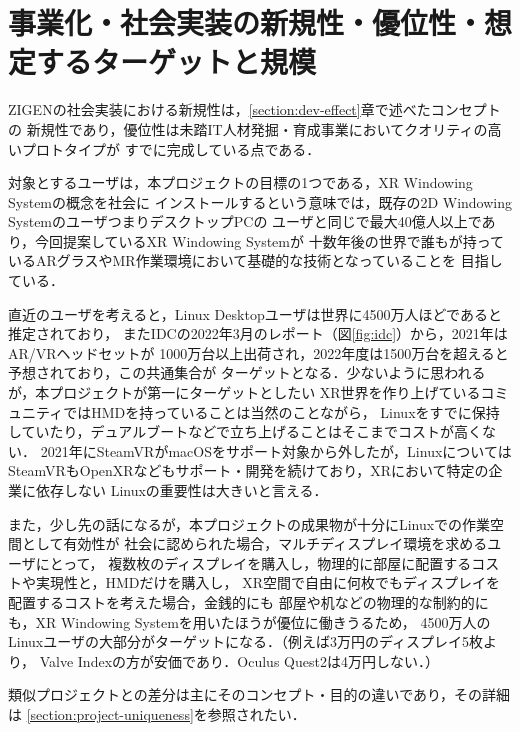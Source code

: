 \section{事業化・社会実装の新規性・優位性・想定するターゲットと規模}


ZIGENの社会実装における新規性は，\ref{section:dev-effect}章で述べたコンセプトの
新規性であり，優位性は未踏IT人材発掘・育成事業においてクオリティの高いプロトタイプが
すでに完成している点である．

対象とするユーザは，本プロジェクトの目標の1つである，XR Windowing Systemの概念を社会に
インストールするという意味では，既存の2D Windowing SystemのユーザつまりデスクトップPCの
ユーザと同じで最大40億人以上であり，今回提案しているXR Windowing Systemが
十数年後の世界で誰もが持っているARグラスやMR作業環境において基礎的な技術となっていることを
目指している．

直近のユーザを考えると，Linux Desktopユーザは世界に4500万人ほどであると推定されており，
またIDCの2022年3月のレポート（図\ref{fig:idc}）から，2021年はAR/VRヘッドセットが
1000万台以上出荷され，2022年度は1500万台を超えると予想されており，この共通集合が
ターゲットとなる．少ないように思われるが，本プロジェクトが第一にターゲットとしたい
XR世界を作り上げているコミュニティではHMDを持っていることは当然のことながら，
Linuxをすでに保持していたり，デュアルブートなどで立ち上げることはそこまでコストが高くない．
2021年にSteamVRがmacOSをサポート対象から外したが，Linuxについては
SteamVRもOpenXRなどもサポート・開発を続けており，XRにおいて特定の企業に依存しない
Linuxの重要性は大きいと言える．

また，少し先の話になるが，本プロジェクトの成果物が十分にLinuxでの作業空間として有効性が
社会に認められた場合，マルチディスプレイ環境を求めるユーザにとって，
複数枚のディスプレイを購入し，物理的に部屋に配置するコストや実現性と，HMDだけを購入し，
XR空間で自由に何枚でもディスプレイを配置するコストを考えた場合，金銭的にも
部屋や机などの物理的な制約的にも，XR Windowing Systemを用いたほうが優位に働きうるため，
4500万人のLinuxユーザの大部分がターゲットになる．（例えば3万円のディスプレイ5枚より，
Valve Indexの方が安価であり．Oculus Quest2は4万円しない．）

類似プロジェクトとの差分は主にそのコンセプト・目的の違いであり，その詳細は
\ref{section:project-uniqueness}を参照されたい．
